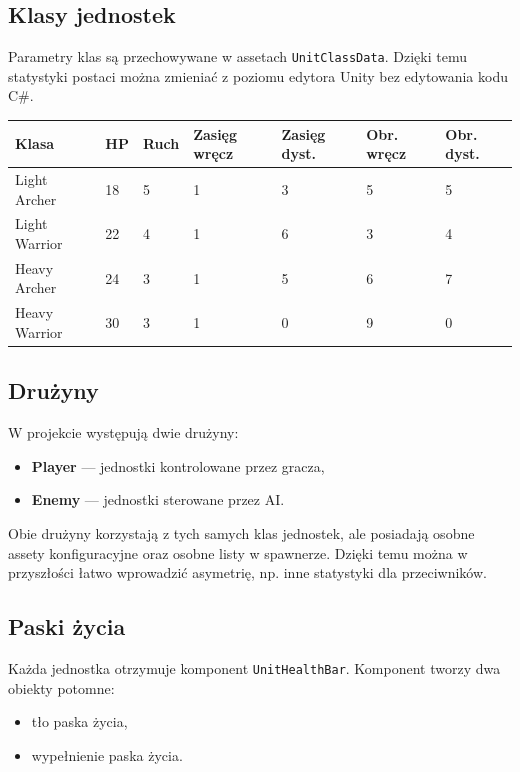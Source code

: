 \documentclass[12pt,a4paper]{article}
\begin{document}
\subsection{Klasy jednostek}

Parametry klas są przechowywane w assetach \texttt{UnitClassData}. Dzięki temu statystyki postaci można zmieniać z poziomu edytora Unity bez edytowania kodu C\#.

\begin{longtable}{p{3.5cm} p{1.8cm} p{1.8cm} p{2cm} p{2cm} p{2cm} p{2cm}}
\toprule
\textbf{Klasa} & \textbf{HP} & \textbf{Ruch} & \textbf{Zasięg wręcz} & \textbf{Zasięg dyst.} & \textbf{Obr. wręcz} & \textbf{Obr. dyst.} \\
\midrule
\endhead
Light Archer & 18 & 5 & 1 & 3 & 5 & 5 \\[4pt]
Light Warrior & 22 & 4 & 1 & 6 & 3 & 4 \\[4pt]
Heavy Archer & 24 & 3 & 1 & 5 & 6 & 7 \\[4pt]
Heavy Warrior & 30 & 3 & 1 & 0 & 9 & 0 \\
\bottomrule
\end{longtable}

\subsection{Drużyny}

W projekcie występują dwie drużyny:

\begin{itemize}
    \item \textbf{Player} --- jednostki kontrolowane przez gracza,
    \item \textbf{Enemy} --- jednostki sterowane przez AI.
\end{itemize}

Obie drużyny korzystają z tych samych klas jednostek, ale posiadają osobne assety konfiguracyjne oraz osobne listy w spawnerze. Dzięki temu można w przyszłości łatwo wprowadzić asymetrię, np. inne statystyki dla przeciwników.

\subsection{Paski życia}

Każda jednostka otrzymuje komponent \texttt{UnitHealthBar}. Komponent tworzy dwa obiekty potomne:

\begin{itemize}
    \item tło paska życia,
    \item wypełnienie paska życia.
\end{itemize}
\end{document}
